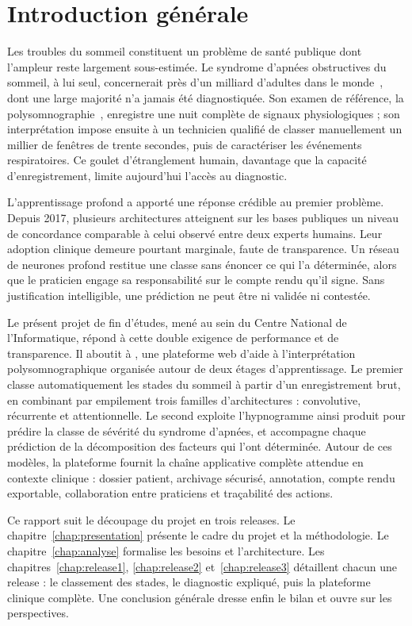 \chapter*{Introduction générale}

Les troubles du sommeil constituent un problème de santé publique dont l'ampleur reste
largement sous-estimée. Le syndrome d'apnées obstructives du sommeil, à lui seul,
concernerait près d'un milliard d'adultes dans le monde~\cite{benjafield2019}, dont une
large majorité n'a jamais été diagnostiquée. Son examen de référence, la
polysomnographie~\cite{kapur2017}, enregistre une
nuit complète de signaux physiologiques ; son interprétation impose ensuite à un
technicien qualifié de classer manuellement un millier de fenêtres de trente secondes,
puis de caractériser les événements respiratoires. Ce goulet d'étranglement humain,
davantage que la capacité d'enregistrement, limite aujourd'hui l'accès au diagnostic.

L'apprentissage profond a apporté une réponse crédible au premier problème. Depuis
2017, plusieurs architectures atteignent sur les bases publiques un niveau de
concordance comparable à celui observé entre deux experts humains. Leur adoption
clinique demeure pourtant marginale, faute de transparence.
Un réseau de neurones profond restitue une classe sans énoncer ce qui l'a
déterminée, alors que le praticien engage sa responsabilité sur le compte rendu qu'il
signe. Sans justification intelligible, une prédiction ne peut être ni validée ni
contestée.

Le présent projet de fin d'études, mené au sein du Centre National de l'Informatique,
répond à cette double exigence de performance et de transparence. Il aboutit à
\hypnoria{}, une plateforme web d'aide à l'interprétation polysomnographique organisée
autour de deux étages d'apprentissage. Le premier classe automatiquement les stades du
sommeil à partir d'un enregistrement brut, en combinant par empilement trois familles
d'architectures : convolutive, récurrente et attentionnelle. Le second exploite
l'hypnogramme ainsi produit pour prédire la classe de sévérité du syndrome d'apnées,
et accompagne chaque prédiction de la décomposition des facteurs qui l'ont déterminée.
Autour de ces modèles, la plateforme fournit la chaîne applicative complète attendue en
contexte clinique : dossier patient, archivage sécurisé, annotation, compte rendu
exportable, collaboration entre praticiens et traçabilité des actions.

Ce rapport suit le découpage du projet en trois releases. Le
chapitre~\ref{chap:presentation} présente le cadre du projet et la méthodologie. Le
chapitre~\ref{chap:analyse} formalise les besoins et l'architecture. Les chapitres~\ref{chap:release1},
\ref{chap:release2} et~\ref{chap:release3} détaillent chacun une release : le
classement des stades, le diagnostic expliqué, puis la plateforme clinique complète. Une
conclusion générale dresse enfin le bilan et ouvre sur les perspectives.
